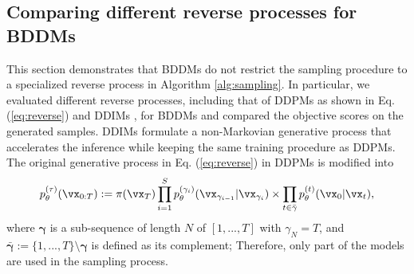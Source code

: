 





\subsection{Comparing different reverse processes for BDDMs}
This section demonstrates that BDDMs do not restrict the sampling procedure to a specialized reverse process in Algorithm \ref{alg:sampling}. In particular, we evaluated different reverse processes, including that of DDPMs as shown in Eq. (\ref{eq:reverse}) and DDIMs \citep{jiaming2021}, for BDDMs and compared the objective scores on the generated samples. DDIMs \citep{jiaming2021} formulate a non-Markovian generative process that accelerates the inference while keeping the same training procedure as DDPMs. The original generative process in Eq. (\ref{eq:reverse}) in DDPMs is modified into
\begin{align}
\label{eq:ddim}
    p_\theta^{(\tau)}(\vx_{0:T})
    :=
\pi(\vx_T)\prod_{i=1}^Sp_\theta^{(\gamma_i)}(\vx_{\gamma_{i-1}}|\vx_{\gamma_i})
\times
\prod_{t\in{\bar{\gamma}}}p_\theta^{(t)}(\vx_0|\vx_t),
\end{align}
where ${\boldsymbol\gamma}$ is a sub-sequence of length $N$ of $[1,...,T]$ with $\gamma_N=T$, and $\bar{{\boldsymbol\gamma}}:=\{1,...,T\}\setminus{\boldsymbol\gamma}$ is defined as its complement; Therefore, only part of the models are used in the sampling process. 

